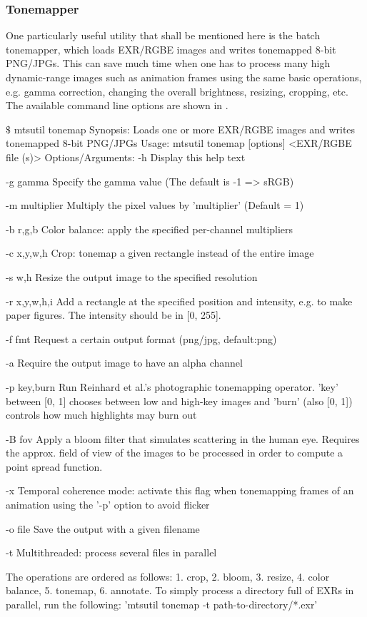 \subsubsection{Tonemapper}
\label{sec:tonemapper}
One particularly useful utility that shall be mentioned here is the batch tonemapper, which
loads EXR/RGBE images and writes tonemapped 8-bit PNG/JPGs. This can save much time when one has to
process many high dynamic-range images such as animation frames using the same basic operations,
e.g. gamma correction, changing the overall brightness, resizing, cropping, etc. The available
command line options are shown in .

\begin{console}[label=lst:tonemap-cli,caption=Command line options of the \texttt{mtsutil tonemap} utility]
$\texttt{\$}$ mtsutil tonemap
Synopsis: Loads one or more EXR/RGBE images and writes tonemapped 8-bit PNG/JPGs
Usage: mtsutil tonemap [options] <EXR/RGBE file (s)>
Options/Arguments:
   -h             Display this help text

   -g gamma       Specify the gamma value (The default is -1 => sRGB)

   -m multiplier  Multiply the pixel values by 'multiplier' (Default = 1)

   -b r,g,b       Color balance: apply the specified per-channel multipliers

   -c x,y,w,h     Crop: tonemap a given rectangle instead of the entire image

   -s w,h         Resize the output image to the specified resolution

   -r x,y,w,h,i   Add a rectangle at the specified position and intensity, e.g.
                  to make paper figures. The intensity should be in [0, 255].

   -f fmt         Request a certain output format (png/jpg, default:png)

   -a             Require the output image to have an alpha channel

   -p key,burn    Run Reinhard et al.'s photographic tonemapping operator. 'key'
                  between [0, 1] chooses between low and high-key images and
                  'burn' (also [0, 1]) controls how much highlights may burn out

   -B fov         Apply a bloom filter that simulates scattering in the human
                  eye. Requires the approx. field of view of the images to be
                  processed in order to compute a point spread function.

   -x             Temporal coherence mode: activate this flag when tonemapping 
                  frames of an animation using the '-p' option to avoid flicker

   -o file        Save the output with a given filename

   -t             Multithreaded: process several files in parallel

 The operations are ordered as follows: 1. crop, 2. bloom, 3. resize, 4. color
 balance, 5. tonemap, 6. annotate. To simply process a directory full of EXRs
 in parallel, run the following: 'mtsutil tonemap -t path-to-directory/*.exr'
\end{console}
